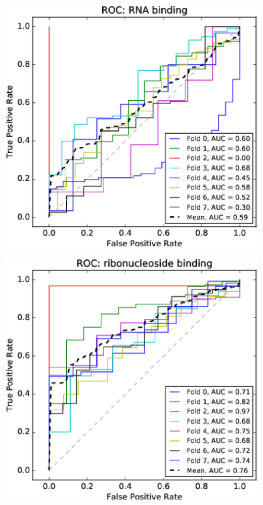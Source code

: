 \documentclass[11pt,twoside,a4paper]{book}
\newenvironment{Figure}
  {\par\medskip\noindent\minipage{\linewidth}}
  {\endminipage\par\medskip}
\begin{document}
\begin{multicols}{2}
\begin{Figure}\begin{center}\includegraphics[width=\linewidth]{figures/roc_RNA_binding}\label{fig:roc_RNA_binding}\end{center}\end{Figure}
\begin{Figure}\begin{center}\includegraphics[width=\linewidth]{figures/roc_ribonucleoside_binding}\label{fig:roc_ribonucleoside_binding}\end{center}\end{Figure}

\end{multicols}
\end{document}
